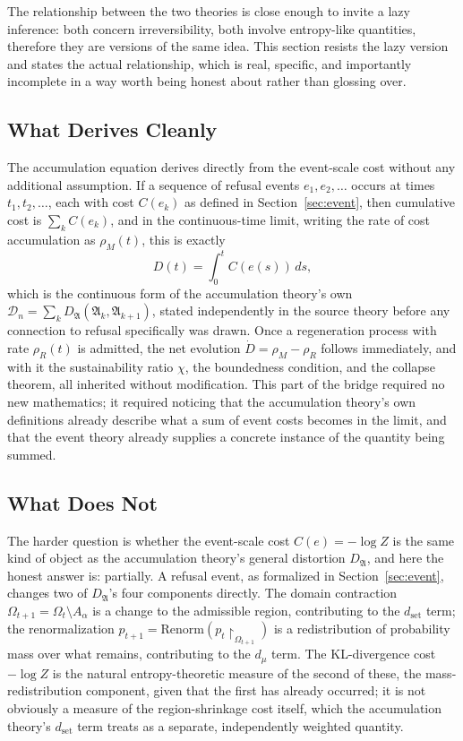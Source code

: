\documentclass[11pt]{article}
\theoremstyle{plain}
\begin{document}
The relationship between the two theories is close enough to invite a lazy inference: both concern irreversibility, both involve entropy-like quantities, therefore they are versions of the same idea. This section resists the lazy version and states the actual relationship, which is real, specific, and importantly incomplete in a way worth being honest about rather than glossing over.

\subsection{What Derives Cleanly}

The accumulation equation derives directly from the event-scale cost without any additional assumption. If a sequence of refusal events $e_1, e_2, \ldots$ occurs at times $t_1, t_2, \ldots$, each with cost $C(e_k)$ as defined in Section~\ref{sec:event}, then cumulative cost is $\sum_k C(e_k)$, and in the continuous-time limit, writing the rate of cost accumulation as $\rho_M(t)$, this is exactly
\[
D(t) = \int_0^t C(e(s))\, ds,
\]
which is the continuous form of the accumulation theory's own $\mathcal{D}_n = \sum_k D_{\mathfrak{A}}(\mathfrak{A}_k, \mathfrak{A}_{k+1})$, stated independently in the source theory before any connection to refusal specifically was drawn. Once a regeneration process with rate $\rho_R(t)$ is admitted, the net evolution $\dot D = \rho_M - \rho_R$ follows immediately, and with it the sustainability ratio $\chi$, the boundedness condition, and the collapse theorem, all inherited without modification. This part of the bridge required no new mathematics; it required noticing that the accumulation theory's own definitions already describe what a sum of event costs becomes in the limit, and that the event theory already supplies a concrete instance of the quantity being summed.

\subsection{What Does Not}

The harder question is whether the event-scale cost $C(e) = -\log Z$ is the same kind of object as the accumulation theory's general distortion $D_{\mathfrak{A}}$, and here the honest answer is: partially. A refusal event, as formalized in Section~\ref{sec:event}, changes two of $D_{\mathfrak{A}}$'s four components directly. The domain contraction $\Omega_{t+1} = \Omega_t \setminus A_\alpha$ is a change to the admissible region, contributing to the $d_{\mathrm{set}}$ term; the renormalization $p_{t+1} = \mathrm{Renorm}(p_t \restriction_{\Omega_{t+1}})$ is a redistribution of probability mass over what remains, contributing to the $d_\mu$ term. The KL-divergence cost $-\log Z$ is the natural entropy-theoretic measure of the second of these, the mass-redistribution component, given that the first has already occurred; it is not obviously a measure of the region-shrinkage cost itself, which the accumulation theory's $d_{\mathrm{set}}$ term treats as a separate, independently weighted quantity.
\end{document}
